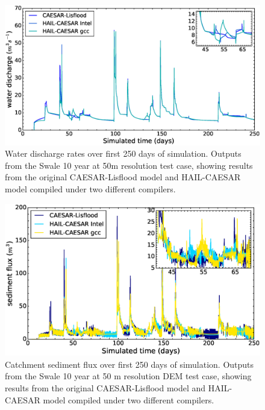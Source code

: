\begin{figure}[t]
\includegraphics[width=15cm]{chp05_figures_scripts/lisflood_comparison.eps}
\caption{Water discharge rates over first 250 days of simulation. Outputs from the Swale 10 year at 50m resolution test case, showing results from the original CAESAR-Lisflood model and HAIL-CAESAR model compiled under two different compilers.}
\label{fig_swale_regression_lisflood}
\end{figure}

\begin{figure}[t]
\includegraphics[width=15cm]{chp05_figures_scripts/sed_tot_comparison.eps}
\caption{Catchment sediment flux over first 250 days of simulation. Outputs from the Swale 10 year at 50 m resolution DEM test case, showing results from the original CAESAR-Lisflood model and HAIL-CAESAR model compiled under two different compilers.}
\label{fig_swale_regression_sediment}
\end{figure}


